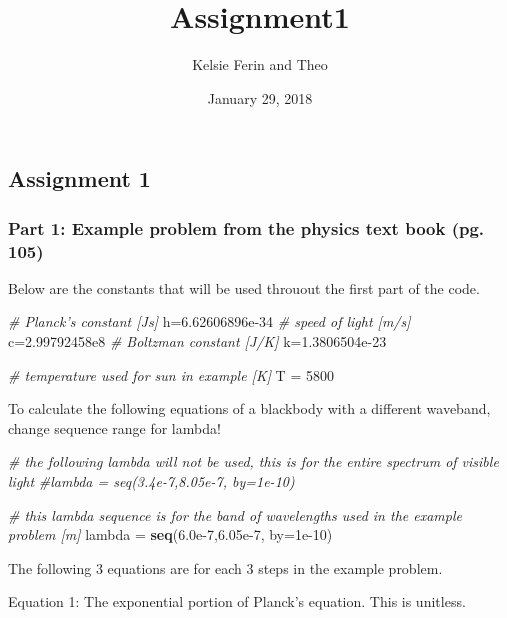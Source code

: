 \documentclass[]{article}
\title{Assignment1}
\author{Kelsie Ferin and Theo}
\date{January 29, 2018}
\newenvironment{Shaded}{\begin{snugshade}}{\end{snugshade}}
\newcommand{\KeywordTok}[1]{\textcolor[rgb]{0.13,0.29,0.53}{\textbf{#1}}}
\newcommand{\DataTypeTok}[1]{\textcolor[rgb]{0.13,0.29,0.53}{#1}}
\newcommand{\DecValTok}[1]{\textcolor[rgb]{0.00,0.00,0.81}{#1}}
\newcommand{\FloatTok}[1]{\textcolor[rgb]{0.00,0.00,0.81}{#1}}
\newcommand{\StringTok}[1]{\textcolor[rgb]{0.31,0.60,0.02}{#1}}
\newcommand{\CommentTok}[1]{\textcolor[rgb]{0.56,0.35,0.01}{\textit{#1}}}
\newcommand{\NormalTok}[1]{#1}
\begin{document}
\maketitle

\subsection{Assignment 1}\label{assignment-1}

\subsubsection{Part 1: Example problem from the physics text book (pg.
105)}\label{part-1-example-problem-from-the-physics-text-book-pg.-105}

Below are the constants that will be used throuout the first part of the
code.

\begin{Shaded}
\begin{Highlighting}[]
\CommentTok{# Planck's constant [Js]}
\NormalTok{h=}\FloatTok{6.62606896e-34}
\CommentTok{# speed of light [m/s]}
\NormalTok{c=}\FloatTok{2.99792458e8} 
\CommentTok{# Boltzman constant [J/K]}
\NormalTok{k=}\FloatTok{1.3806504e-23} 

\CommentTok{# temperature used for sun in example [K]}
\NormalTok{T =}\StringTok{ }\DecValTok{5800}
\end{Highlighting}
\end{Shaded}

To calculate the following equations of a blackbody with a different
waveband, change sequence range for lambda!

\begin{Shaded}
\begin{Highlighting}[]
\CommentTok{# the following lambda will not be used, this is for the entire spectrum of visible light}
\CommentTok{#lambda = seq(3.4e-7,8.05e-7, by=1e-10)}

\CommentTok{# this lambda sequence is for the band of wavelengths used in the example problem [m]}
\NormalTok{lambda =}\StringTok{ }\KeywordTok{seq}\NormalTok{(}\FloatTok{6.0e-7}\NormalTok{,}\FloatTok{6.05e-7}\NormalTok{, }\DataTypeTok{by=}\FloatTok{1e-10}\NormalTok{)}
\end{Highlighting}
\end{Shaded}

The following 3 equations are for each 3 steps in the example problem.

Equation 1: The exponential portion of Planck's equation. This is
unitless.
\end{document}
